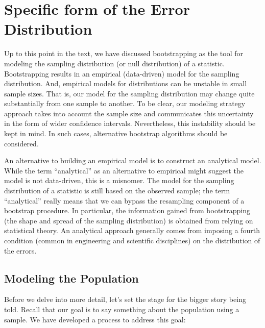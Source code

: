 \documentclass[
  letterpaper,
  DIV=11,
  numbers=noendperiod]{scrreprt}
\theoremstyle{plain}
\theoremstyle{definition}
\theoremstyle{definition}
\theoremstyle{remark}
\begin{document}
\hypertarget{specific-form-of-the-error-distribution}{%
\section{Specific form of the Error
Distribution}\label{specific-form-of-the-error-distribution}}

Up to this point in the text, we have discussed bootstrapping as the
tool for modeling the sampling distribution (or null distribution) of a
statistic. Bootstrapping results in an empirical (data-driven) model for
the sampling distribution. And, empirical models for distributions can
be unstable in small sample sizes. That is, our model for the sampling
distribution may change quite substantially from one sample to another.
To be clear, our modeling strategy approach takes into account the
sample size and communicates this uncertainty in the form of wider
confidence intervals. Nevertheless, this instability should be kept in
mind. In such cases, alternative bootstrap algorithms should be
considered.

An alternative to building an empirical model is to construct an
analytical model. While the term ``analytical'' as an alternative to
empirical might suggest the model is not data-driven, this is a
misnomer. The model for the sampling distribution of a statistic is
still based on the observed sample; the term ``analytical'' really means
that we can bypass the resampling component of a bootstrap procedure. In
particular, the information gained from bootstrapping (the shape and
spread of the sampling distribution) is obtained from relying on
statistical theory. An analytical approach generally comes from imposing
a fourth condition (common in engineering and scientific disciplines) on
the distribution of the errors.

\hypertarget{modeling-the-population}{%
\subsection{Modeling the Population}\label{modeling-the-population}}

Before we delve into more detail, let's set the stage for the bigger
story being told. Recall that our goal is to say something about the
population using a sample. We have developed a process to address this
goal:
\end{document}
